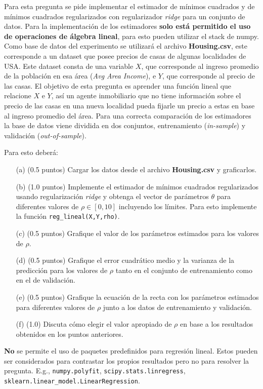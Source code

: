 \documentclass[11pt,letterpaper]{article}
\begin{document}
Para esta pregunta se pide implementar el estimador de mínimos cuadrados y de mínimos cuadrados regularizados con regularizador \textit{ridge} para un conjunto de datos. Para la implementación de los estimadores \textbf{solo está permitido el uso de operaciones de álgebra lineal}, para esto pueden utilizar el stack de numpy.\\

Como base de datos del experimento se utilizará el archivo \textbf{Housing.csv}, este corresponde a un dataset que posee precios de casas de algunas localidades de USA. Este dataset consta de  una variable $X$, que corresponde al ingreso promedio de la población en esa área (\textit{Avg Area Income}), e $Y$, que corresponde al precio de las casas. El objetivo de esta pregunta es aprender una función lineal que relacione $X$ e $Y$, así un agente inmobiliario que no tiene información sobre el precio de las casas en una nueva localidad pueda fijarle un precio a estas en base al ingreso promedio del área. Para una correcta comparación de los estimadores la base de datos viene dividida en dos conjuntos, entrenamiento (\textit{in-sample}) y validación (\textit{out-of-sample}).

Para esto deberá:
\begin{itemize}
	\item[(a)] (0.5 puntos) Cargar los datos desde el archivo \textbf{Housing.csv} y graficarlos.
	\item[(b)] (1.0 puntos) Implemente el estimador de mínimos cuadrados regularizados usando regularización \textit{ridge} y obtenga el vector de parámetros $\theta$ para diferentes valores de $\rho \in [0, 10]$ incluyendo los límites. Para esto implemente la función \texttt{reg\_lineal(X,Y,rho)}. 
	\item[(c)] (0.5 puntos) Grafique el valor de los parámetros estimados para los valores de $\rho$.
	\item[(d)] (0.5 puntos) Grafique el error cuadrático medio y la varianza de la predicción para los valores de $\rho$ tanto en el conjunto de entrenamiento como en el de validación. 
	\item[(e)] (0.5 puntos) Grafique la ecuación de la recta con los parámetros estimados para diferentes valores de $\rho$ junto a los datos de entrenamiento y validación.
	\item[(f)] (1.0) Discuta cómo elegir  el valor apropiado de $\rho$ en base a los resultados obtenidos en los puntos anteriores.
\end{itemize}

 \textbf{No} se permite el uso de paquetes predefinidos para regresión lineal. Estos pueden ser considerados para contrastar los propios resultados pero no para resolver la pregunta. E.g., \texttt{numpy.polyfit},  \texttt{scipy.stats.linregress}, \texttt{sklearn.linear\_model.LinearRegression}.
\end{document}
